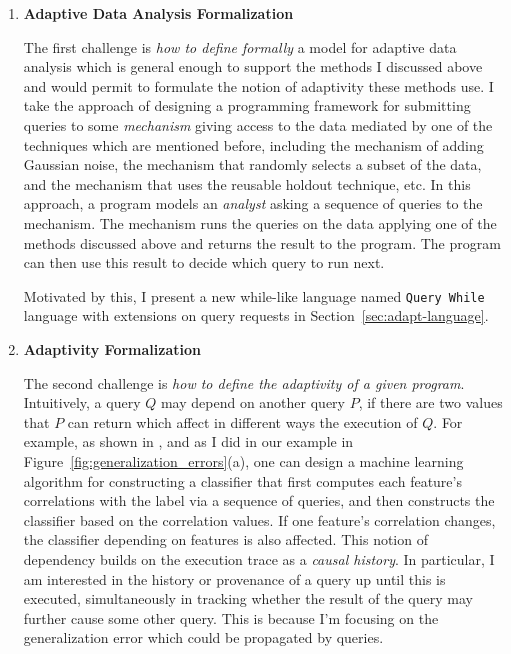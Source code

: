 \begin{enumerate}
 \item
 \textbf{Adaptive Data Analysis Formalization}

The first challenge is \emph{how to define formally} a model for adaptive data analysis which is general enough to support the methods I discussed above and would permit to formulate the notion of adaptivity these methods use. 
I take the approach of designing a programming framework for submitting queries to some \emph{mechanism} giving access 
to the data mediated by one of the techniques which are mentioned before, 
including the mechanism of adding Gaussian noise, 
the mechanism that randomly selects a subset of the data, 
and the mechanism that uses the reusable holdout technique, etc. 
In this approach, a program models an \emph{analyst} asking a sequence of queries to the mechanism. 
The mechanism runs the queries on the data applying one of the methods discussed above and returns the result to the program. The program can then use this result to decide which query to run next. 

Motivated by this, I present a new while-like language 
named {\tt Query While} language with extensions on query requests in Section~\ref{sec:adapt-language}.

\item 
\textbf{Adaptivity Formalization}

The second challenge is \emph{how to define the adaptivity of a given program}.
Intuitively, a query $Q$ may depend on another query $P$, if there are two values that $P$ can return which affect in different ways the execution of $Q$. 
For example, as shown in \cite{dwork2015reusable}, and as I did in our example in Figure~\ref{fig:generalization_errors}(a), one can design a machine learning algorithm for constructing a classifier that first computes each feature's correlations with the label via a sequence of queries, and then constructs the classifier based on the correlation values. 
If one feature's correlation changes, the classifier depending on features is also affected. 
This notion of dependency builds on the execution trace as a \emph{causal history}. 
In particular, I am interested in the history or provenance of a query up until this is executed, 
simultaneously in tracking whether the result of the query may further cause some other query. 
This is because I'm focusing on the generalization error which could be propagated by queries.


\end{enumerate}
